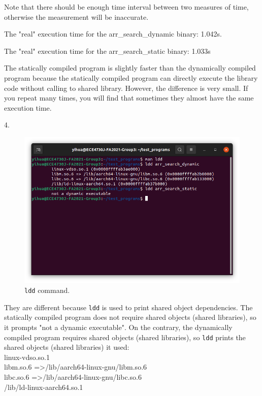 \documentclass[a4paper]{article}
\begin{document}
Note that there should be enough time interval between two measures of time, otherwise the measurement will be inaccurate.

The "real" execution time for the arr\_search\_dynamic binary: 1.042s.

The "real" execution time for the arr\_search\_static binary: 1.033s

The statically compiled program is slightly faster than the dynamically compiled program because the statically compiled program can directly execute the library code without calling to shared library. However, the difference is very small. If you repeat many times, you will find that sometimes they almost have the same execution time.

4.
\begin{figure}[H]
    \centering
    \includegraphics[width=1\textwidth]{3.png}
    \caption{\texttt{ldd} command.}
\end{figure}
They are different because \texttt{ldd} is used to print shared object dependencies. The statically compiled program does not require shared objects (shared libraries), so it prompts "not a dynamic executable". On the contrary, the dynamically compiled program requires shared objects (shared libraries), so \texttt{ldd} prints the shared objects (shared libraries) it used:\\
linux-vdso.so.1\\
libm.so.6 =\textgreater /lib/aarch64-linux-gnu/libm.so.6\\
libc.so.6 =\textgreater /lib/aarch64-linux-gnu/libc.so.6\\
/lib/ld-linux-aarch64.so.1
\end{document}
